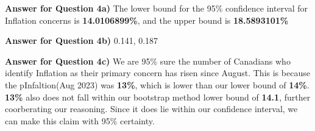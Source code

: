 \documentclass[
]{article}
\newenvironment{Shaded}{\begin{snugshade}}{\end{snugshade}}
\newcommand{\AttributeTok}[1]{\textcolor[rgb]{0.77,0.63,0.00}{#1}}
\newcommand{\ConstantTok}[1]{\textcolor[rgb]{0.00,0.00,0.00}{#1}}
\newcommand{\DecValTok}[1]{\textcolor[rgb]{0.00,0.00,0.81}{#1}}
\newcommand{\FloatTok}[1]{\textcolor[rgb]{0.00,0.00,0.81}{#1}}
\newcommand{\FunctionTok}[1]{\textcolor[rgb]{0.00,0.00,0.00}{#1}}
\newcommand{\NormalTok}[1]{#1}
\newcommand{\OtherTok}[1]{\textcolor[rgb]{0.56,0.35,0.01}{#1}}
\newcommand{\SpecialCharTok}[1]{\textcolor[rgb]{0.00,0.00,0.00}{#1}}
\begin{document}
\begin{Shaded}
\end{Shaded}

\textbf{Answer for Question 4a)} The lower bound for the 95\% confidence
interval for Inflation concerns is \textbf{14.0106899\%}, and the upper
bound is \textbf{18.5893101\%}

\textbf{Answer for Question 4b)} 0.141, 0.187

\textbf{Answer for Question 4c)} We are 95\% sure the number of
Canadians who identify Inflation as their primary concern has risen
since August. This is because the pInfaltion(Aug 2023) was
\textbf{13\%}, which is lower than our lower bound of \textbf{14\%}.
\textbf{13\%} also does not fall within our bootstrap method lower bound
of \textbf{14.1}, further coorberating our reasoning. Since it does lie
within our confidence interval, we can make this claim with 95\%
certainty.
\end{document}
